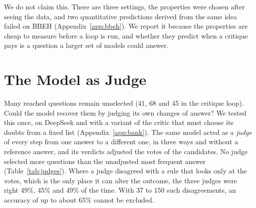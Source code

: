 \documentclass[11pt]{article}
\newcommand{\ds}{DeepSeek}
\begin{document}
We do not claim this.
There are three settings, the properties were chosen after seeing the data, and two quantitative predictions derived from the same idea failed on BBEH (Appendix~\ref{app:bbeh}).
We report it because the properties are cheap to measure before a loop is run, and whether they predict when a critique pays is a question a larger set of models could answer.

\section{The Model as Judge}
\label{app:judges}
\label{sec:judges}

Many reached questions remain unselected (41, 68 and 45 in the critique loop).
Could the model recover them by judging its own changes of answer?
We tested this once, on \ds{} and with a variant of the critic that must choose its doubts from a fixed list (Appendix~\ref{app:bank}).
The same model acted as a \emph{judge} of every step from one answer to a different one, in three ways and without a reference answer, and its verdicts adjusted the votes of the candidates.
No judge selected more questions than the unadjusted most frequent answer (Table~\ref{tab:judges}).
Where a judge disagreed with a rule that looks only at the votes, which is the only place it can alter the outcome, the three judges were right 49\%, 45\% and 49\% of the time. With 37 to 150 such disagreements, an accuracy of up to about 65\% cannot be excluded.
\end{document}
